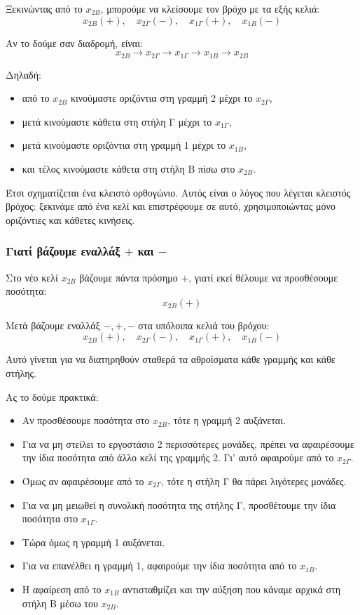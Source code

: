 \documentclass[12pt,a4paper]{article}
\begin{document}
Ξεκινώντας από το \(x_{2B}\), μπορούμε να κλείσουμε τον βρόχο με τα εξής κελιά:
\[
x_{2B}(+),\quad x_{2\Gamma}(-),\quad x_{1\Gamma}(+),\quad x_{1B}(-)
\]

Αν το δούμε σαν διαδρομή, είναι:
\[
x_{2B}\rightarrow x_{2\Gamma}\rightarrow x_{1\Gamma}\rightarrow x_{1B}\rightarrow x_{2B}
\]

Δηλαδή:

\begin{itemize}
    \item από το \(x_{2B}\) κινούμαστε οριζόντια στη γραμμή 2 μέχρι το \(x_{2\Gamma}\),
    \item μετά κινούμαστε κάθετα στη στήλη Γ μέχρι το \(x_{1\Gamma}\),
    \item μετά κινούμαστε οριζόντια στη γραμμή 1 μέχρι το \(x_{1B}\),
    \item και τέλος κινούμαστε κάθετα στη στήλη Β πίσω στο \(x_{2B}\).
\end{itemize}

Έτσι σχηματίζεται ένα κλειστό ορθογώνιο. Αυτός είναι ο λόγος που λέγεται κλειστός βρόχος: ξεκινάμε από ένα κελί και επιστρέφουμε σε αυτό, χρησιμοποιώντας μόνο οριζόντιες και κάθετες κινήσεις.

\subsubsection*{Γιατί βάζουμε εναλλάξ \(+\) και \(-\)}

Στο νέο κελί \(x_{2B}\) βάζουμε πάντα πρόσημο \(+\), γιατί εκεί θέλουμε να προσθέσουμε ποσότητα:
\[
x_{2B}(+)
\]

Μετά βάζουμε εναλλάξ \(-,+,-\) στα υπόλοιπα κελιά του βρόχου:
\[
x_{2B}(+),\quad x_{2\Gamma}(-),\quad x_{1\Gamma}(+),\quad x_{1B}(-)
\]

Αυτό γίνεται για να διατηρηθούν σταθερά τα αθροίσματα κάθε γραμμής και κάθε στήλης.

Ας το δούμε πρακτικά:

\begin{itemize}
    \item Αν προσθέσουμε ποσότητα στο \(x_{2B}\), τότε η γραμμή 2 αυξάνεται.
    \item Για να μη στείλει το εργοστάσιο 2 περισσότερες μονάδες, πρέπει να αφαιρέσουμε την ίδια ποσότητα από άλλο κελί της γραμμής 2. Γι' αυτό αφαιρούμε από το \(x_{2\Gamma}\).
    \item Όμως αν αφαιρέσουμε από το \(x_{2\Gamma}\), τότε η στήλη Γ θα πάρει λιγότερες μονάδες.
    \item Για να μη μειωθεί η συνολική ποσότητα της στήλης Γ, προσθέτουμε την ίδια ποσότητα στο \(x_{1\Gamma}\).
    \item Τώρα όμως η γραμμή 1 αυξάνεται.
    \item Για να επανέλθει η γραμμή 1, αφαιρούμε την ίδια ποσότητα από το \(x_{1B}\).
    \item Η αφαίρεση από το \(x_{1B}\) αντισταθμίζει και την αύξηση που κάναμε αρχικά στη στήλη Β μέσω του \(x_{2B}\).
\end{itemize}
\end{document}
